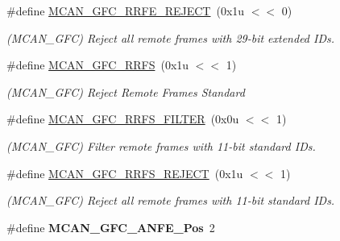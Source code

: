 \begin{DoxyCompactItemize}
\mbox{\label{group__SAMV71__MCAN_ga65cb69597d99374a0f64c20cca12b1cf}} 
\#define \mbox{\hyperlink{group__SAMV71__MCAN_ga65cb69597d99374a0f64c20cca12b1cf}{M\+C\+A\+N\+\_\+\+G\+F\+C\+\_\+\+R\+R\+F\+E\+\_\+\+R\+E\+J\+E\+CT}}~(0x1u $<$$<$ 0)
\begin{DoxyCompactList}\small\item\em (M\+C\+A\+N\+\_\+\+G\+FC) Reject all remote frames with 29-\/bit extended I\+Ds. \end{DoxyCompactList}\item 
\mbox{\label{group__SAMV71__MCAN_ga121b6b86a5b881288ee5d9225bc06209}} 
\#define \mbox{\hyperlink{group__SAMV71__MCAN_ga121b6b86a5b881288ee5d9225bc06209}{M\+C\+A\+N\+\_\+\+G\+F\+C\+\_\+\+R\+R\+FS}}~(0x1u $<$$<$ 1)
\begin{DoxyCompactList}\small\item\em (M\+C\+A\+N\+\_\+\+G\+FC) Reject Remote Frames Standard \end{DoxyCompactList}\item 
\mbox{\label{group__SAMV71__MCAN_ga63ff8bdf6378fa161b5e31c20ea29aa1}} 
\#define \mbox{\hyperlink{group__SAMV71__MCAN_ga63ff8bdf6378fa161b5e31c20ea29aa1}{M\+C\+A\+N\+\_\+\+G\+F\+C\+\_\+\+R\+R\+F\+S\+\_\+\+F\+I\+L\+T\+ER}}~(0x0u $<$$<$ 1)
\begin{DoxyCompactList}\small\item\em (M\+C\+A\+N\+\_\+\+G\+FC) Filter remote frames with 11-\/bit standard I\+Ds. \end{DoxyCompactList}\item 
\mbox{\label{group__SAMV71__MCAN_gac5f997ee8b26196347d65f79017d3c35}} 
\#define \mbox{\hyperlink{group__SAMV71__MCAN_gac5f997ee8b26196347d65f79017d3c35}{M\+C\+A\+N\+\_\+\+G\+F\+C\+\_\+\+R\+R\+F\+S\+\_\+\+R\+E\+J\+E\+CT}}~(0x1u $<$$<$ 1)
\begin{DoxyCompactList}\small\item\em (M\+C\+A\+N\+\_\+\+G\+FC) Reject all remote frames with 11-\/bit standard I\+Ds. \end{DoxyCompactList}\item 
\mbox{\label{group__SAMV71__MCAN_ga93422466fc0a51e9a4ae1a29e88a0673}} 
\#define {\bfseries M\+C\+A\+N\+\_\+\+G\+F\+C\+\_\+\+A\+N\+F\+E\+\_\+\+Pos}~2

\end{DoxyCompactItemize}
